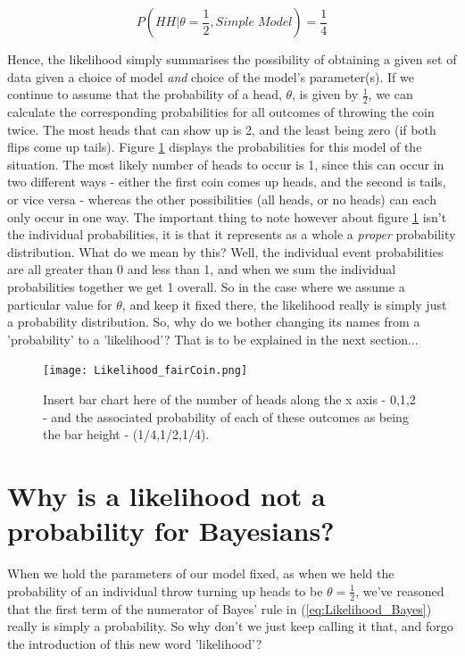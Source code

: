 \documentclass[11pt,fullpage]{book}
\begin{document}
\begin{equation}
P(HH|\theta=\frac{1}{2},Simple\;Model) = \frac{1}{4}
\end{equation}\label{eq:Likelihood_fairCoin}

Hence, the likelihood simply summarises the possibility of obtaining a given set of data given a choice of model \textit{and} choice of the model's parameter(s). If we continue to assume that the probability of a head, $\theta$, is given by $\frac{1}{2}$, we can calculate the corresponding probabilities for all outcomes of throwing the coin twice. The most heads that can show up is 2, and the least being zero (if both flips come up tails). Figure \ref{fig:Likelihood_fairCoin} displays the probabilities for this model of the situation. The most likely number of heads to occur is 1, since this can occur in two different ways - either the first coin comes up heads, and the second is tails, or vice versa - whereas the other possibilities (all heads, or no heads) can each only occur in one way. The important thing to note however about figure \ref{fig:Likelihood_fairCoin} isn't the individual probabilities, it is that it represents as a whole a \textit{proper} probability distribution. What do we mean by this? Well, the individual event probabilities are all greater than 0 and less than 1, and when we sum the individual probabilities together we get 1 overall. So in the case where we assume a particular value for $\theta$, and keep it fixed there, the likelihood really is simply just a probability distribution. So, why do we bother changing its names from a 'probability' to a 'likelihood'? That is to be explained in the next section...

\begin{figure}
\centering
\scalebox{0.25} 
{\texttt{[image: Likelihood\_fairCoin.png]}}
\caption{Insert bar chart here of the number of heads along the x axis - 0,1,2 - and the associated probability of each of these outcomes as being the bar height - (1/4,1/2,1/4).}\label{fig:Likelihood_fairCoin}
\end{figure}

\section{Why is a likelihood not a probability for Bayesians?}
When we hold the parameters of our model fixed, as when we held the probability of an individual throw turning up heads to be $\theta=\frac{1}{2}$, we've reasoned that the first term of the numerator of Bayes' rule in (\ref{eq:Likelihood_Bayes}) really is simply a probability. So why don't we just keep calling it that, and forgo the introduction of this new word 'likelihood'? 
\end{document}
